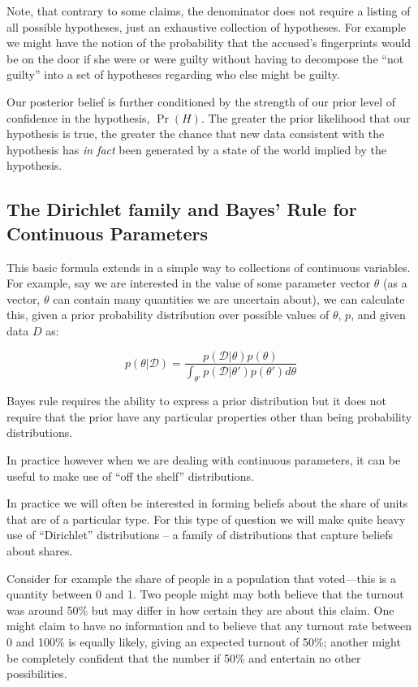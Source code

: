 \documentclass[
  12pt,
]{book}
\begin{document}
Note, that contrary to some claims, the denominator does not require a listing of all possible hypotheses, just an exhaustive collection of hypotheses. For example we might have the notion of the probability that the accused's fingerprints would be on the door if she were or were guilty without having to decompose the ``not guilty'' into a set of hypotheses regarding who else might be guilty.

Our posterior belief is further conditioned by the strength of our prior level of confidence in the hypothesis, \(\Pr(H)\). The greater the prior likelihood that our hypothesis is true, the greater the chance that new data consistent with the hypothesis has \emph{in fact} been generated by a state of the world implied by the hypothesis.

\hypertarget{the-dirichlet-family-and-bayes-rule-for-continuous-parameters}{%
\subsection{The Dirichlet family and Bayes' Rule for Continuous Parameters}\label{the-dirichlet-family-and-bayes-rule-for-continuous-parameters}}

This basic formula extends in a simple way to collections of continuous variables. For example, say we are interested in the value of some parameter vector \(\theta\) (as a vector, \(\theta\) can contain many quantities we are uncertain about), we can calculate this, given a prior probability distribution over possible values of \(\theta\), \(p\), and given data \(D\) as:

\[p(\theta|\mathcal{D})=\frac{p(\mathcal{D}|\theta)p(\theta)}{\int_{\theta'}p(\mathcal{D|\theta'})p(\theta')d\theta}\]

Bayes rule requires the ability to express a prior distribution but it does not require that the prior have any particular properties other than being probability distributions.

In practice however when we are dealing with continuous parameters, it can be useful to make use of ``off the shelf'' distributions.

In practice we will often be interested in forming beliefs about the share of units that are of a particular type. For this type of question we will make quite heavy use of ``Dirichlet'' distributions -- a family of distributions that capture beliefs about shares.

Consider for example the share of people in a population that voted---this is a quantity between 0 and 1. Two people might may both believe that the turnout was around 50\% but may differ in how certain they are about this claim. One might claim to have no information and to believe that any turnout rate between 0 and 100\% is equally likely, giving an expected turnout of 50\%; another might be completely confident that the number if 50\% and entertain no other possibilities.
\end{document}
